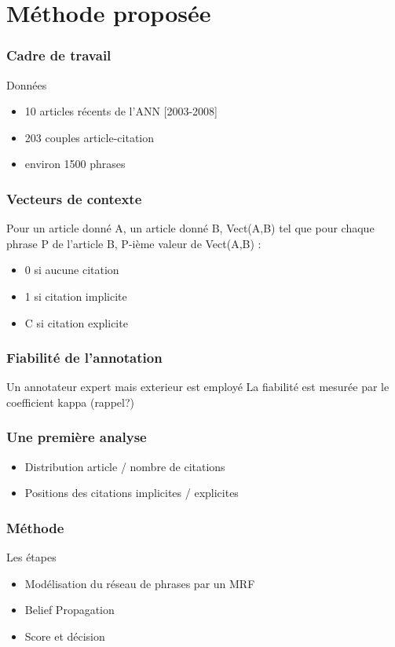 \documentclass[12pt]{beamer}
\begin{document}
\section{Méthode proposée}


\begin{frame}
  \frametitle{Cadre de travail}
  \begin{block}{Données}
  \begin{itemize}
    \item 10 articles récents de l'ANN [2003-2008]
    \item 203 couples article-citation
    \item environ 1500 phrases
  \end{itemize}
  \end{block}
\end{frame}

\begin{frame}
  \frametitle{Vecteurs de contexte}
  Pour un article donné A, un article donné B,
  Vect(A,B) tel que pour chaque phrase P de l'article B, P-ième valeur de Vect(A,B) :
  \begin{itemize}
    \item 0 si aucune citation
    \item 1 si citation implicite
    \item C si citation explicite
  \end{itemize}
\end{frame}

\begin{frame}
  \frametitle{Fiabilité de l'annotation}
  Un annotateur expert mais exterieur est employé
  La fiabilité est mesurée par le coefficient kappa (rappel?)
\end{frame}

\begin{frame}
  \frametitle{Une première analyse}
  \begin{itemize}
    \item Distribution article / nombre de citations
    \item Positions des citations implicites / explicites
  \end{itemize}
\end{frame}

\begin{frame}
  \frametitle{Méthode}
  Les étapes
  \begin{itemize}
    \item Modélisation du réseau de phrases par un MRF
    \item Belief Propagation
    \item Score et décision
  \end{itemize}
\end{frame}
\end{document}

